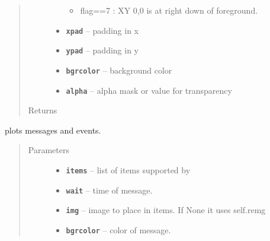 \documentclass[letterpaper,10pt,english]{sphinxmanual}
\begin{document}
\begin{fulllineitems}
\begin{fulllineitems}
\begin{quote}
\begin{description}
\begin{itemize}
\begin{itemize}
\item {} 
flag==7 : XY 0,0 is at right down of foreground.

\end{itemize}


\item {} 
\textbf{\texttt{xpad}} -- padding in x

\item {} 
\textbf{\texttt{ypad}} -- padding in y

\item {} 
\textbf{\texttt{bgrcolor}} -- background color

\item {} 
\textbf{\texttt{alpha}} -- alpha mask or value for transparency

\end{itemize}

\item[{Returns}] \leavevmode


\end{description}\end{quote}

\end{fulllineitems}


\begin{fulllineitems}
\label{RRtoolbox.lib:RRtoolbox.lib.plotter.Plotim.plotintime}
plots messages and events.
\begin{quote}\begin{description}
\item[{Parameters}] \leavevmode\begin{itemize}
\item {} 
\textbf{\texttt{items}} -- list of items supported by {\hyperref[RRtoolbox.lib:RRtoolbox.lib.plotter.Plotim.makeoverlay]{\emph{}}}

\item {} 
\textbf{\texttt{wait}} -- time of message.

\item {} 
\textbf{\texttt{img}} -- image to place in items. If None it uses self.remg

\item {} 
\textbf{\texttt{bgrcolor}} -- color of message.

\end{itemize}


\end{description}
\end{quote}
\end{fulllineitems}
\end{fulllineitems}
\end{document}
